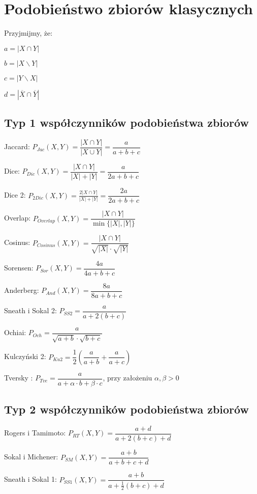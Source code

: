 \section{Podobieństwo zbiorów klasycznych}

Przyjmijmy, że:

$ a = |X\cap Y| $

$ b = |X\backslash Y| $

$ c = |Y\backslash X| $

$ d = |\overline{X} \cap \overline{Y}| $ \\

\subsection*{Typ 1 współczynników podobieństwa zbiorów}

Jaccard: $ P_{Jac}(X,Y) = \dfrac{|X \cap Y|}{|X \cup Y|} = \dfrac{a}{a+b+c} $

Dice: $ P_{Dic}(X,Y) = \dfrac{|X \cap Y|}{|X| + |Y|} = \dfrac{a}{2a+b+c} $

Dice 2: $ P_{2Dic}(X,Y) = \frac{2|X \cap Y|}{|X| + |Y|} = \dfrac{2a}{2a+b+c} $

Overlap: $ P_{Overlap}(X,Y) = \dfrac{|X \cap Y|}{\min\{|X|, |Y|\}}$

Cosinus: $ P_{Cosinus}(X,Y) = \dfrac{|X \cap Y|}{\sqrt{|X|} \cdot \sqrt{|Y|}}$

Sorensen: $ P_{Sor}(X,Y) = \dfrac{4a}{4a + b + c} $

Anderberg: $ P_{And}(X,Y) = \dfrac{8a}{8a + b + c} $

Sneath i Sokal 2: $ P_{SS2} = \dfrac{a}{a + 2(b+c)} $

Ochiai: $ P_{Och} = \dfrac{a}{\sqrt{a+b} \cdot \sqrt{b+c}} $

Kulczyński 2: $ P_{Ku2} = \dfrac{1}{2} \left( \dfrac{a}{a+b} + \dfrac{a}{a+c} \right) $

Tversky : $ P_{Tve} = \dfrac{a}{a + \alpha \cdot b + \beta \cdot c} $, przy założeniu $ \alpha, \beta > 0 $

\subsection*{Typ 2 współczynników podobieństwa zbiorów}

Rogers i Tamimoto: $ P_{RT}(X,Y) = \dfrac{a+d}{a + 2(b+c) + d} $

Sokal i Michener: $ P_{SM}(X,Y) = \dfrac{a+b}{a + b + c + d} $

Sneath i Sokal 1: $ P_{SS1}(X,Y) = \dfrac{a+b}{a + \frac{1}{2}(b + c) + d} $

